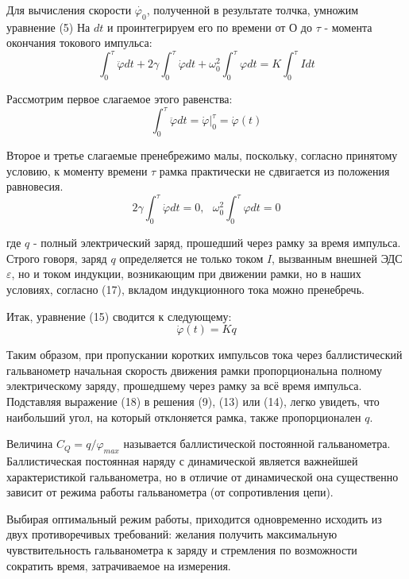 \documentclass[14pt]{article}
\begin{document}
Для вычисления скорости $\dot{\varphi_0}$, полученной в результате толчка, умножим уравнение (5) На $dt$ и проинтегрируем его по времени от О до $\tau$ - момента окончания токового импульса:
\begin{equation}
	\int_0^\tau \ddot{\varphi}dt + 2\gamma\int_0^\tau \dot{\varphi}dt + \omega_0^2\int_0^\tau \varphi dt = K \int_0^\tau Idt
\end{equation}

Рассмотрим первое слагаемое этого равенства:
\begin{equation}
	\int_0^\tau \ddot{\varphi}dt = \dot{\varphi}\big|_0^\tau = \dot{\varphi}(t)
\end{equation}

Второе и третье слагаемые пренебрежимо малы, поскольку, согласно принятому условию, к моменту времени $\tau$ рамка практически не сдвигается из положения равновесия.
\begin{equation}
	2\gamma\int_0^\tau \dot{\varphi}dt = 0,~~~\omega_0^2\int_0^\tau \varphi dt = 0
\end{equation}

где $q$ - полный электрический заряд, прошедший через рамку за время импульса. Строго говоря, заряд $q$ определяется не только током $I$, вызванным внешней ЭДС 
$\varepsilon$, но и током индукции, возникающим при движении рамки, но в наших условиях, согласно (17), вкладом индукционного тока можно пренебречь.

Итак, уравнение (15) сводится к следующему:
\begin{equation}
	\dot{\varphi}(t) = Kq
\end{equation}

Таким образом, при пропускании коротких импульсов тока через баллистический гальванометр начальная скорость движения рамки пропорциональна полному электрическому заряду, прошедшему через рамку за всё время импульса. Подставляя выражение (18) в решения (9), (13) или (14), легко увидеть, что наибольший угол, на который отклоняется рамка, также пропорционален $q$.

Величина $C_Q = q/\varphi_{max}$ называется баллистической постоянной гальванометра. Баллистическая постоянная наряду с динамической является важнейшей характеристикой гальванометра, но в отличие от динамической она существенно зависит от режима работы гальванометра (от сопротивления цепи).

Выбирая оптимальный режим работы, приходится одновременно исходить из двух противоречивых требований: желания получить максимальную чувствительность гальванометра к заряду и стремления по возможности сократить время, затрачиваемое на измерения.
\end{document}
